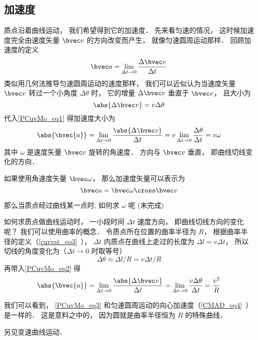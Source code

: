 


\subsection{加速度}
质点沿着曲线运动， 我们希望得到它的加速度． 先来看匀速的情况， 这时候加速度完全由速度矢量 $\bvec v$ 的方向改变而产生， 就像匀速圆周运动那样． 回顾加速度的定义
\begin{equation}\label{PCuvMo_eq2}
\bvec a = \lim_{\Delta t \to 0} \frac{\Delta \bvec v}{\Delta t}
\end{equation}
类似用几何法推导匀速圆周运动的速度那样， 我们可以近似认为当速度矢量 $\bvec v$ 转过一个小角度 $\Delta \theta$ 时， 它的增量 $\Delta \bvec v$ 垂直于 $\bvec v$， 且大小为
\begin{equation}\label{PCuvMo_eq1}
\abs{\Delta \bvec v} = v\Delta\theta
\end{equation}
代入\autoref{PCuvMo_eq1} 得加速度大小为
\begin{equation}
\abs{\bvec{a}} = \lim_{\Delta t \to 0} \frac{\abs{\Delta \bvec v}}{\Delta t}
= v\lim_{\Delta t \to 0}\frac{\Delta \theta}{\Delta t} = v\omega
\end{equation}
其中 $\omega$ 是速度矢量 $\bvec v$ 旋转的角速度． 方向与 $\bvec v$ 垂直， 即曲线切线变化的方向．

如果使用角速度矢量 $\bvec \omega$， 那么加速度矢量可以表示为
\begin{equation}
\bvec a = \bvec \omega \cross \bvec v
\end{equation}

那么当质点经过曲线某一点时, 如何求 $\omega$ 呢
(未完成)

如何求质点做曲线运动时， 一小段时间 $\Delta t$ 速度方向， 即曲线切线方向的变化呢？ 我们可以使用曲率的概念． 令质点所在位置的曲率半径为 $R$， 根据曲率半径的定义（\autoref{curvat_eq3}~）， $\Delta t$ 内质点在曲线上走过的长度为 $\Delta l = v \Delta t$， 所以切线的角度变化为（$\Delta t\to 0$ 时取等号）
\begin{equation}
\Delta \theta \approx \Delta l/R = v \Delta t/R
\end{equation}
 再带入\autoref{PCuvMo_eq2} 得
\begin{equation}\label{PCuvMo_eq3}
\abs{\bvec{a}} = \lim_{\Delta t \to 0} \frac{\abs{\Delta \bvec v}}{\Delta t}
= \lim_{\Delta t \to 0}  \frac{v\Delta\theta}{\Delta t} = \frac{v^2}{R}
\end{equation}


我们可以看到， \autoref{PCuvMo_eq3} 和匀速圆周运动的向心加速度（\autoref{CMAD_eq4}~）是一样的． 这是意料之中的， 因为圆就是曲率半径恒为 $R$ 的特殊曲线．

另见变速曲线运动．
